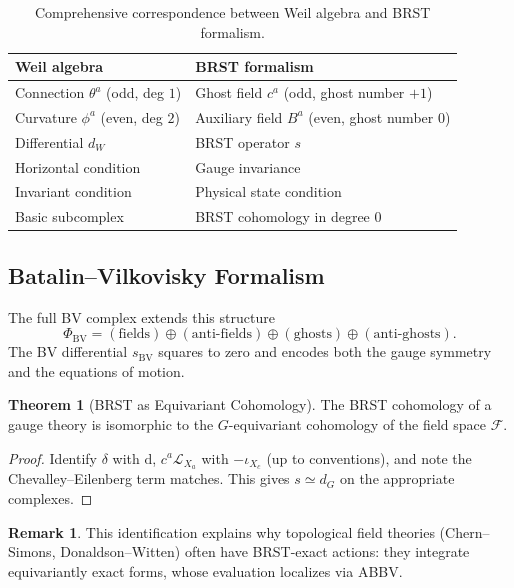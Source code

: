 \documentclass[10pt]{article}
\theoremstyle{definition}
\newtheorem{theorem}[definition]{Theorem}
\newtheorem{remark}[definition]{Remark}
\newcommand{\diff}{\mathrm{d}}
\newcommand{\lie}[1]{\mathcal{L}_{#1}}
\newcommand{\cont}[1]{\iota_{#1}}
\begin{document}
\begin{table}[ht]
\centering
\renewcommand{\arraystretch}{1.3}
\begin{tabular}{l l}
\toprule
\textbf{Weil algebra} & \textbf{BRST formalism} \\
\midrule
Connection $\theta^{a}$ (odd, deg $1$) & Ghost field $c^{a}$ (odd, ghost number $+1$) \\
Curvature $\phi^{a}$ (even, deg $2$) & Auxiliary field $B^{a}$ (even, ghost number $0$) \\
Differential $d_{W}$ & BRST operator $s$ \\
Horizontal condition & Gauge invariance \\
Invariant condition & Physical state condition \\
Basic subcomplex & BRST cohomology in degree 0 \\
\bottomrule
\end{tabular}
\caption{Comprehensive correspondence between Weil algebra and BRST formalism.}
\label{tab:WeilBRST}
\end{table}

\subsection{Batalin--Vilkovisky Formalism}
The full BV complex extends this structure
\begin{equation}
\Phi_{\text{BV}} = (\text{fields}) \oplus (\text{anti-fields}) \oplus (\text{ghosts}) \oplus (\text{anti-ghosts}).
\end{equation}
The BV differential $s_{\text{BV}}$ squares to zero and encodes both the gauge symmetry and the equations of motion.

\begin{theorem}[BRST as Equivariant Cohomology]
The BRST cohomology of a gauge theory is isomorphic to the $G$-equivariant cohomology of the field space $\mathcal{F}$.
\end{theorem}
\begin{proof}
Identify $\delta$ with $\diff$, $c^{a}\lie{X_{a}}$ with $-\cont{X_{c}}$ (up to conventions), and note the Chevalley--Eilenberg term matches. This gives $s \simeq d_G$ on the appropriate complexes.
\end{proof}

\begin{remark}
This identification explains why topological field theories (Chern--Simons, Donaldson--Witten) often have BRST-exact actions: they integrate equivariantly exact forms, whose evaluation localizes via ABBV.
\end{remark}
\end{document}
